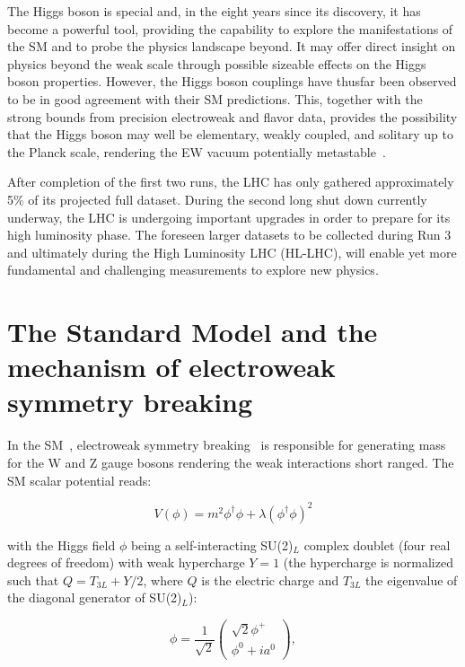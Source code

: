 \documentclass[12pt]{article}
\begin{document}
The Higgs boson is special and, in the eight years since its discovery, it has become a powerful tool, providing the capability to explore the manifestations of the SM and to probe the physics landscape beyond. It may offer direct insight on physics beyond the weak scale through possible sizeable effects on the Higgs boson properties. However, the Higgs boson couplings have thusfar been observed to be in good agreement with their SM predictions. This, together with the strong bounds from precision electroweak and flavor data, provides the possibility that the Higgs boson may well be elementary, weakly coupled, and solitary up to the Planck scale, rendering the EW vacuum potentially metastable~\cite{Degrassi:2012ry,Alekhin:2012py,Buttazzo:2013uya}.

After completion of the first two runs, the LHC has only gathered approximately 5\% of its projected full dataset. During the second long shut down currently underway, the LHC is undergoing important upgrades in order to prepare for its high luminosity phase. The foreseen larger datasets to be collected during Run 3 and ultimately during the High Luminosity LHC (HL-LHC), will enable yet more fundamental and challenging measurements to explore new physics.

\section{The Standard Model and the mechanism of electroweak symmetry breaking}

In the SM~\cite{Glashow:1961tr,PhysRevLett.19.1264,PhysRevD.2.1285}, electroweak symmetry breaking~\cite{PhysRevLett.13.321,PhysRev.145.1156} is responsible for generating mass for the W and Z gauge bosons rendering the weak interactions short ranged. The SM scalar potential reads:

\begin{equation}
    V (\phi) = m^2\phi^\dagger\phi + \lambda(\phi^\dagger\phi)^2
\end{equation}

with the Higgs field $\phi$ being a self-interacting SU(2)$_L$ complex doublet (four real degrees of freedom) with weak hypercharge $Y = 1$ (the hypercharge is normalized such that $Q = T_{3L} + Y /2$, where $Q$ is the electric charge and $T_{3L}$ the eigenvalue of the diagonal generator of SU(2)$_L$):

\begin{equation}
    \phi = \frac{1}{\sqrt{2}}
    \begin{pmatrix}
        \sqrt{2}\phi^+ \\
        \phi^0 + ia^0
    \end{pmatrix},
\end{equation}
\end{document}
